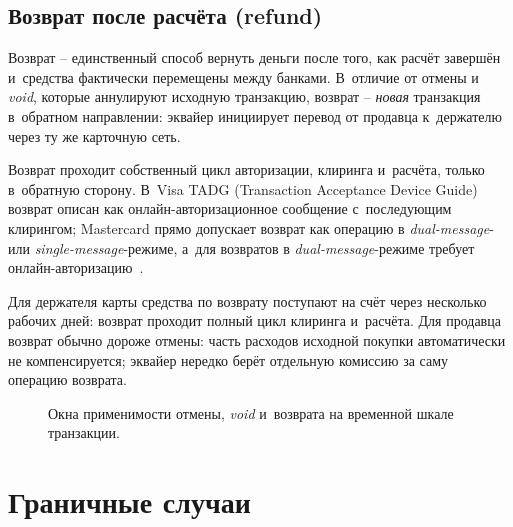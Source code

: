\subsection*{Возврат после расчёта (refund)}

Возврат -- единственный способ вернуть деньги после того, как
расчёт завершён и~средства фактически перемещены между банками.
В~отличие от отмены и \textit{void}, которые аннулируют исходную транзакцию,
возврат -- \emph{новая} транзакция в~обратном направлении: эквайер
инициирует перевод от продавца к~держателю через ту же карточную
сеть.

Возврат проходит собственный цикл авторизации, клиринга и~расчёта,
только в~обратную сторону. В~Visa TADG (Transaction Acceptance Device Guide) возврат описан как
онлайн-авторизационное сообщение с~последующим клирингом; Mastercard
прямо допускает возврат как операцию в \textit{dual-message}- или
\textit{single-message}-режиме, а~для возвратов в \textit{dual-message}-режиме
требует онлайн-авторизацию~\cite{visa-tadg,mc-tpr}.

Для держателя карты средства по возврату поступают на счёт через
несколько рабочих дней: возврат проходит полный цикл клиринга и~расчёта.
Для продавца возврат обычно дороже отмены: часть расходов исходной покупки
автоматически не компенсируется; эквайер нередко берёт отдельную
комиссию за саму операцию возврата.

\begin{figure}[tbp]
  \centering
  \caption{Окна применимости отмены, \textit{void} и~возврата на временной
  шкале транзакции.}\label{fig:tx-cancellation-timeline}
\end{figure}

\section{Граничные случаи}\label{sec:tx-edge-cases}

